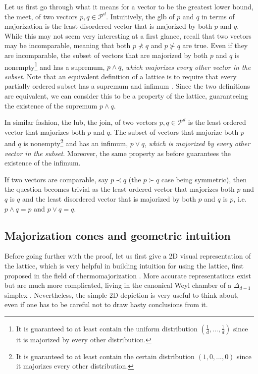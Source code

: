 Let us first go through what it means for a vector to be the greatest lower bound, the meet, of two vectors $p, q \in \mathcal{P}^d$. Intuitively, the glb of $p$ and $q$ in terms of majorization is the least disordered vector that is majorized by both $p$ and $q$. While this may not seem very interesting at a first glance, recall that two vectors may be incomparable, meaning that both $p \nprec q$ and $p \nsucc q$ are true. Even if they are incomparable, the subset of vectors that are majorized by both $p$ and $q$ is nonempty\footnote{It is guaranteed to at least contain the uniform distribution $(\frac{1}{d}, ..., \frac{1}{d})$ since it is majorized by every other distribution.} and has a supremum, $p \wedge q$, \textit{which majorizes every other vector in the subset}. Note that an equivalent definition of a lattice is to require that every partially ordered subset has a supremum and infimum \cite[p. 19]{marshall_inequalities_2011}. Since the two definitions are equivalent, we can consider this to be a property of the lattice, guaranteeing the existence of the supremum $p \wedge q$.

In similar fashion, the lub, the join, of two vectors $p, q \in \mathcal{P}^d$ is the least ordered vector that majorizes both $p$ and $q$. The subset of vectors that majorize both $p$ and $q$ is nonempty\footnote{It is guaranteed to at least contain the certain distribution $(1, 0, ..., 0)$ since it majorizes every other distribution.} and has an infimum, $p \vee q$, \textit{which is majorized by every other vector in the subset}. Moreover, the same property as before guarantees the existence of the infimum.

\begin{remark} \label{rem:comp_meet_join}
    If two vectors are comparable, say $p \prec q$ (the $p \succ q$ case being symmetric), then the question becomes trivial as the least ordered vector that majorizes both $p$ and $q$ is $q$ and the least disordered vector that is majorized by both $p$ and $q$ is $p$, i.e. $p \wedge q = p$ and $p \vee q = q$.
\end{remark}



\subsection{Majorization cones and geometric intuition}

Before going further with the proof, let us first give a 2D visual representation of the lattice, which is very helpful in building intuition for using the lattice, first proposed in the field of thermomajorization \cite{korzekwa_structure_2017}. More accurate representations exist but are much more complicated, living in the canonical Weyl chamber of a $\Delta_{d-1}$ simplex \cite{junior_geometric_2022}. Nevertheless, the simple 2D depiction is very useful to think about, even if one has to be careful not to draw hasty conclusions from it.

